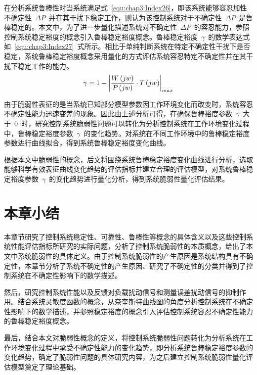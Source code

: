 在分析系统鲁棒性时当系统满足式~\ref{equ:chap3:Index26}，即该系统能够容忍加性不确定性~$\Delta P$~并在其干扰下稳定工作，则认为该控制系统对于不确定性~$\Delta P$~是鲁棒稳定的。本文中，为了进一步量化描述系统对不确定性~$\Delta P$~的容忍能力，参照控制系统稳定裕度的概念引入鲁棒稳定裕度概念。鲁棒稳定裕度~$\gamma$~的数学表达式如~\ref{equ:chap3:Index27}~式所示。相比于单纯判断系统在特定不确定性干扰下是否稳定，系统鲁棒稳定裕度概念采用量化的方式评估系统容忍特定不确定性并在其干扰下稳定工作的能力。
\begin{equation}\label{equ:chap3:Index27}
\gamma=1-\left\vert\displaystyle\frac{W\left(jw\right)}{P\left(jw\right)}\cdot T\left(jw\right)\right\vert_{max}
\end{equation}

由于脆弱性表征的是当系统已知部分模型参数因工作环境变化而改变时，系统容忍不确定性能力迅速变差的现象。因此由上述分析可得，在确保鲁棒裕度参数~$\gamma$~大于~0~时，研究控制系统脆弱性问题可以转化为分析控制系统在工作环境变化过程中，鲁棒稳定裕度参数~$\gamma$~的变化趋势。对系统在不同工作环境中的鲁棒稳定裕度参数进行曲线拟合，得到系统鲁棒稳定裕度变化曲线。

根据本文中脆弱性的概念，后文将围绕系统鲁棒稳定裕度变化曲线进行分析，选取能够科学有效表征曲线变化趋势的评估指标并建立合理的评估模型，对系统鲁棒稳定裕度参数~$\gamma$~的变化趋势进行量化分析，得到系统脆弱性量化评估结果。

\section{本章小结}
\label{sec:chap3:sum}
本章节研究了控制系统稳定性、可靠性、鲁棒性等概念的具体含义以及这些控制系统性能评估指标所研究的实际问题，分析了控制系统脆弱性的本质概念，给出了本文中系统脆弱性的具体定义。由于控制系统脆弱性的产生原因是系统结构具有不确定性，本章节分析了系统不确定性的产生原因、研究了不确定性的分类并得到了控制系统在不确定性影响下的数学描述。

然后，研究控制系统性能以及反馈对负载扰动信号和测量误差扰动信号的抑制作用。结合系统灵敏度函数的概念，从奈奎斯特曲线图的角度分析控制系统在不确定性影响下的数学描述，并参照稳定裕度的概念引入评估控制系统容忍不确定性能力的鲁棒稳定裕度概念。

最后，结合本文对脆弱性概念的定义，将控制系统脆弱性问题转化为分析系统在工作环境变化过程中承受不确定性能力的变化趋势，即分析系统鲁棒稳定裕度参数的变化趋势，确定了脆弱性问题的具体研究内容，为之后建立控制系统脆弱性量化评估模型奠定了理论基础。